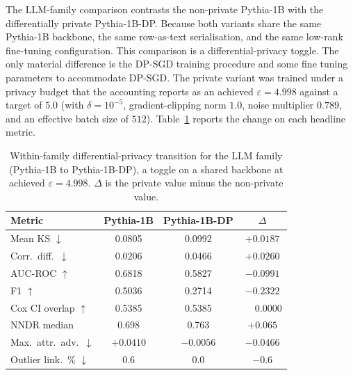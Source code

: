 The LLM-family comparison contrasts the non-private Pythia-1B with the
differentially private Pythia-1B-DP. Because both variants share the same
Pythia-1B backbone, the same row-as-text serialisation, and the same
low-rank fine-tuning configuration. This comparison is a
differential-privacy toggle. The only material difference is the DP-SGD
training procedure and some fine tuning parameters to accommodate DP-SGD. The private
variant was trained under a privacy budget that the accounting reports as
an achieved $\varepsilon = 4.998$ against a target of $5.0$ (with
$\delta = 10^{-5}$, gradient-clipping norm $1.0$, noise multiplier
$0.789$, and an effective batch size of $512$).
Table~\ref{tab:rq3:llm-toggle} reports the change on each headline metric.

\begin{table}[H]
\centering
\small
\caption{Within-family differential-privacy transition for the LLM family
(Pythia-1B to Pythia-1B-DP), a toggle on a shared backbone at
achieved $\varepsilon = 4.998$. $\Delta$ is the private value minus the
non-private value.}
\label{tab:rq3:llm-toggle}
\begin{tabular}{lccc}
\toprule
Metric & Pythia-1B & Pythia-1B-DP & $\Delta$ \\
\midrule
Mean KS $\downarrow$       & 0.0805 & 0.0992 & $+0.0187$ \\
Corr.\ diff.\ $\downarrow$ & 0.0206 & 0.0466 & $+0.0260$ \\
AUC-ROC $\uparrow$         & 0.6818 & 0.5827 & $-0.0991$ \\
F1 $\uparrow$              & 0.5036 & 0.2714 & $-0.2322$ \\
Cox CI overlap $\uparrow$  & 0.5385 & 0.5385 & $\phantom{+}0.0000$ \\
NNDR median                & 0.698  & 0.763  & $+0.065$ \\
Max.\ attr.\ adv.\ $\downarrow$ & $+0.0410$ & $-0.0056$ & $-0.0466$ \\
Outlier link.\ \% $\downarrow$  & 0.6 & 0.0 & $-0.6$ \\
\bottomrule
\end{tabular}
\end{table}

